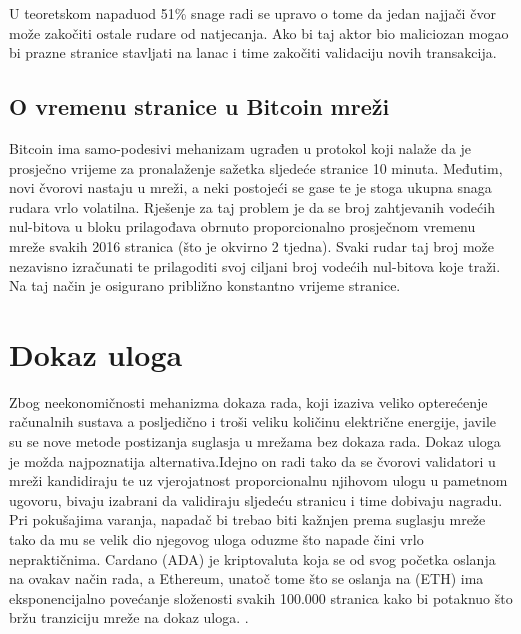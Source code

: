 \documentclass[utf8, zavrsni]{fer}
\begin{document}
U teoretskom napadu\footnotemark od 51\% snage radi se upravo o tome da jedan najjači čvor može zakočiti ostale rudare od natjecanja. Ako bi taj aktor bio maliciozan mogao bi prazne stranice stavljati na lanac i time zakočiti validaciju novih transakcija.

\subsection{O vremenu stranice u Bitcoin mreži}
Bitcoin ima samo-podesivi mehanizam ugrađen u protokol koji nalaže da je prosječno vrijeme za pronalaženje sažetka sljedeće stranice 10 minuta. Međutim, novi čvorovi nastaju u mreži, a neki postojeći se gase te je stoga ukupna snaga rudara vrlo volatilna. Rješenje za taj problem je da se broj zahtjevanih vodećih nul-bitova u bloku prilagođava obrnuto proporcionalno prosječnom vremenu mreže svakih 2016 stranica (što je okvirno 2 tjedna). Svaki rudar taj broj može nezavisno izračunati te prilagoditi svoj ciljani broj vodećih nul-bitova koje traži. Na taj način je osigurano približno konstantno vrijeme stranice.

\section{Dokaz uloga}
Zbog neekonomičnosti mehanizma dokaza rada, koji izaziva veliko opterećenje računalnih sustava a posljedično i troši veliku količinu električne energije, javile su se nove metode postizanja suglasja u mrežama bez dokaza rada. Dokaz uloga\footnotemark {}
je možda najpoznatija alternativa.Idejno on radi tako da se čvorovi validatori u mreži kandidiraju te uz vjerojatnost proporcionalnu njihovom ulogu u pametnom ugovoru, bivaju izabrani da validiraju sljedeću stranicu i time dobivaju nagradu. Pri pokušajima varanja, napadač bi trebao biti kažnjen prema suglasju mreže tako da mu se velik dio njegovog uloga oduzme što napade čini vrlo nepraktičnima. Cardano (ADA)\footnotemark \footnotetext{} je kriptovaluta koja se od svog početka oslanja na ovakav način rada, a Ethereum, unatoč tome što se oslanja na  (ETH) ima eksponencijalno povećanje složenosti svakih 100.000 stranica kako bi potaknuo što bržu tranziciju mreže na dokaz uloga. \cite{wood2014ethereum}.

\end{document}
